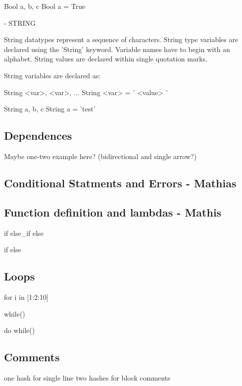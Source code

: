 Bool a, b, c
Bool a = True



- STRING

String datatypes represent a sequence of characters. String type variables are declared using the 'String' keyword. Variable names have to begin with an alphabet. String values are declared within single quotation marks.

String variables are declared as:

String <var>, <var>, ...
String <var> = ' <value> '

String a, b, c
String a = 'test'


\subsection{Dependences}
Maybe one-two example here? (bidirectional and single arrow?)

\subsection{Conditional Statments and Errors - Mathias}

\subsection{Function definition and lambdas - Mathis}

if {}
else\_if {}
else{}

if {}
else{}


\subsection{Loops}
for i in [1:2:10]{}

while(){}

do{}
while()



\subsection{Comments}
one hash for single line
two hashes for block comments


\label{sect:core}

